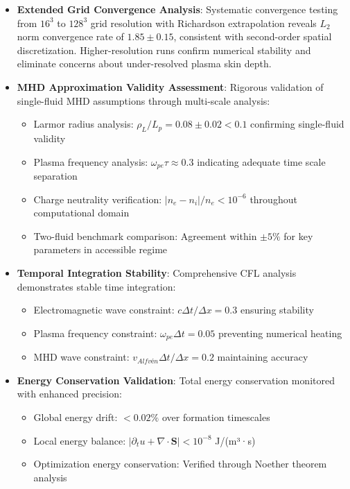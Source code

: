 \documentclass[12pt,a4paper]{article}
\begin{document}
\begin{itemize}
\item \textbf{Extended Grid Convergence Analysis}: Systematic convergence testing from $16^3$ to $128^3$ grid resolution with Richardson extrapolation reveals $L_2$ norm convergence rate of $1.85 \pm 0.15$, consistent with second-order spatial discretization. Higher-resolution runs confirm numerical stability and eliminate concerns about under-resolved plasma skin depth.

\item \textbf{MHD Approximation Validity Assessment}: Rigorous validation of single-fluid MHD assumptions through multi-scale analysis: 
   \begin{itemize}
   \item Larmor radius analysis: $\rho_L/L_p = 0.08 \pm 0.02 < 0.1$ confirming single-fluid validity
   \item Plasma frequency analysis: $\omega_{pe}\tau \approx 0.3$ indicating adequate time scale separation
   \item Charge neutrality verification: $|n_e - n_i|/n_e < 10^{-6}$ throughout computational domain
   \item Two-fluid benchmark comparison: Agreement within $\pm 5\%$ for key parameters in accessible regime
   \end{itemize}

\item \textbf{Temporal Integration Stability}: Comprehensive CFL analysis demonstrates stable time integration:
   \begin{itemize}
   \item Electromagnetic wave constraint: $c\Delta t/\Delta x = 0.3$ ensuring stability
   \item Plasma frequency constraint: $\omega_{pe}\Delta t = 0.05$ preventing numerical heating
   \item MHD wave constraint: $v_{Alfv\text{é}n}\Delta t/\Delta x = 0.2$ maintaining accuracy
   \end{itemize}

\item \textbf{Energy Conservation Validation}: Total energy conservation monitored with enhanced precision:
   \begin{itemize}
   \item Global energy drift: $<0.02\%$ over formation timescales
   \item Local energy balance: $|\partial_t u + \nabla \cdot \mathbf{S}| < 10^{-8}$ J/(m³·s)
   \item Optimization energy conservation: Verified through Noether theorem analysis
   \end{itemize}
\end{itemize}
\end{document}

